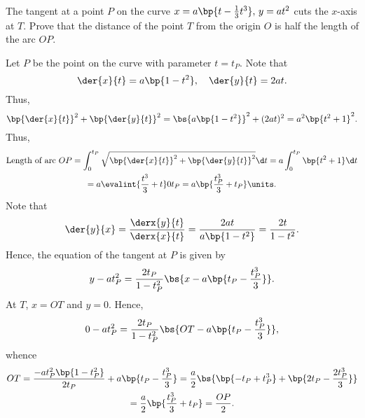 \begin{problem}
    The tangent at a point $P$ on the curve $x = a\bp{t - \frac13 t^3}, \, y = at^2$ cuts the $x$-axis at $T$. Prove that the distance of the point $T$ from the origin $O$ is half the length of the arc $OP$.
\end{problem}
\begin{solution}
    Let $P$ be the point on the curve with parameter $t = t_P$. Note that \[\der{x}{t} = a\bp{1 - t^2}, \quad \der{y}{t} = 2at.\] Thus, \[\bp{\der{x}{t}}^2 + \bp{\der{y}{t}}^2 = \bs{a\bp{1-t^2}}^2 + (2at)^2 = a^2 \bp{t^2 + 1}^2.\] Thus,
    \begin{gather*}
        \text{Length of arc $OP$} = \int_0^{t_P} \sqrt{\bp{\der{x}{t}}^2 + \bp{\der{y}{t}}^2} \d t = a \int_0^{t_P} \bp{t^2 + 1} \d t \\
        = a \evalint{\frac{t^3}3 + t}0{t_P} = a \bp{\frac{t_P^3}3 + t_P} \units.
    \end{gather*}
    Note that \[\der{y}{x} = \frac{\derx{y}{t}}{\derx{x}{t}} = \frac{2at}{a\bp{1 - t^2}} = \frac{2t}{1-t^2}.\] Hence, the equation of the tangent at $P$ is given by \[y - at_P^2 = \frac{2t_P}{1 - t_P^2} \bs{x - a\bp{t_P - \frac{t_P^3}3}}.\] At $T$, $x = OT$ and $y = 0$. Hence, \[0 - at_P^2 = \frac{2t_P}{1 - t_P^2} \bs{OT - a\bp{t_P - \frac{t_P^3}3}},\] whence
    \begin{gather*}
        OT = \frac{-a t_P^2 \bp{1 - t_P^2}}{2t_P} + a\bp{t_P - \frac{t_P^3}3} = \frac{a}{2} \bs{\bp{-t_P + t_P^3} + \bp{2t_P - \frac{2t_P^3}3}}\\
        = \frac{a}2 \bp{\frac{t_P^3}3 + t_P} = \frac{OP}2.
    \end{gather*}
\end{solution}

